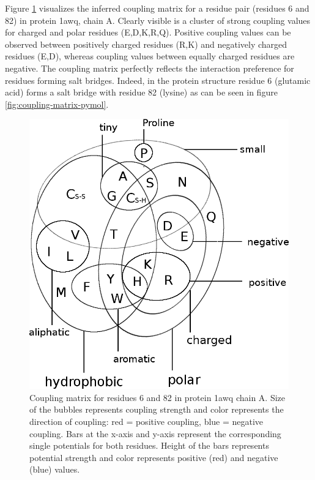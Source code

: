 \documentclass[12pt,a4paper,twoside]{book}
\theoremstyle{definition}
\theoremstyle{definition}
\theoremstyle{remark}
\begin{document}
Figure \ref{fig:coupling-matrix-ionic-interaction} visualizes the
inferred coupling matrix for a residue pair (residues 6 and 82) in
protein 1awq, chain A. Clearly visible is a cluster of strong coupling
values for charged and polar residues (E,D,K,R,Q). Positive coupling
values can be observed between positively charged residues (R,K) and
negatively charged residues (E,D), whereas coupling values between
equally charged residues are negative. The coupling matrix perfectly
reflects the interaction preference for residues forming salt bridges.
Indeed, in the protein structure residue 6 (glutamic acid) forms a salt
bridge with residue 82 (lysine) as can be seen in figure
\ref{fig:coupling-matrix-pymol}.









\begin{figure}
\includegraphics[width=1\linewidth]{img/amino_acid_physico_chemical_properties_venn_diagramm} \caption{Coupling matrix for
residues 6 and 82 in protein 1awq chain A. Size of the bubbles
represents coupling strength and color represents the direction of
coupling: red = positive coupling, blue = negative coupling. Bars at the
x-axis and y-axis represent the corresponding single potentials for both
residues. Height of the bars represents potential strength and color
represents positive (red) and negative (blue) values.}\label{fig:coupling-matrix-ionic-interaction}
\end{figure}
\end{document}
